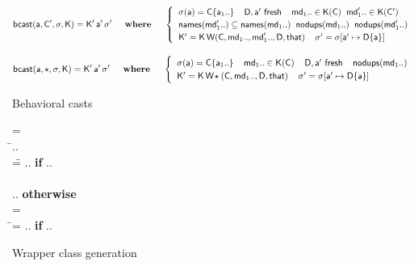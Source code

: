 \documentclass[acmsmall, anonymous, authordraft, review]{acmart} %
\begin{document}
\begin{figure}[!b]
\hrulefill
\small

\vspace{-4mm}

\begin{equation*}
  \behcastE\a\Cp\s\K \Kp\ap\sp \HS\HS\WHERE\HS\HS \begin{cases}
\HS  \App\s\a = \obj\C{\a[1]..} \HS\HS
  \fresh{\D,\ap} \HS\HS
  \md[1].. \In \App\K\C \HS \mdp[1].. \In \App\K\Cp \\\HS
  \names{\mdp[1]..} \subseteq \names{\md[1]..} \HS \cload{\md[1]..} \HS \cload{\mdp[1]..} \\\HS
  \Kp = \K\,\wrap\C{\md[1]..}{\mdp[1]..}\D\that \HS\HS
  \sp = \Map \s{\Bind\ap{\obj\D{\a}}} 
  \end{cases}
\end{equation*}

\begin{equation*}
  \behcastE\a\any\s\K \Kp\ap\sp  \HS\HS\WHERE\HS\HS\begin{cases}\HS
  \App\s\a = \obj\C{\a[1]..} \HS\HS \md[1].. \In \App\K\C \HS\HS
  \fresh{\D,\ap} \HS\HS \cload{\md[1]..} \\\HS
  \Kp = \K\,\wrapAny\C{\md[1]..}\D\that \HS\HS
  \sp = \Map \s{\Bind\ap{\obj\D{\a}}} 
\end{cases}\end{equation*}


\hrulefill
\vspace{-2mm}\caption{Behavioral casts}\label{behavetext}

\hrulefill
\small

\begin{tabbing}\small
  \wrap{}\D\that = \\
  \HS\HS\WHERE\HS\= \Mdef\m\x{\t[1]}{\t[2]}\e\In\md[1].. \\
                 \> \mdpp[1] =\= \src{\Mdef\m\x{\tp[1]}{\tp[2]}{~\BehCast{\tp[2]}{\KCall{\FRead\that}\m{\bscast{\tp[1]}\x}{\t[1]}{\t[2]}}}} ..
    \HS \= \textbf{if} \HS \Mdef\m\x{\tp[1]}{\tp[2]}\ep\In\mdp[1].. \\
\\[-3mm]
\> \>  \src{\Mdef\m\x{\t[1]}{\t[2]}{~\KCall{\FRead\that}\m{\x}{\t[1]}{\t[2]}}} ..  \>\textbf{otherwise}
\\[3mm]
   = \\
\HS\HS\WHERE\HS\=\mdp[1] = \src{ \Mdef\m\x{\any}{\any}{~\BehCast\any{ \KCall{\FRead\that} \m {\bscast{\t}\x}{\t}{\tp}} } }   ..
    \HS\HS\HS\HS \= \textbf{if} \HS \Mdef\m\x{\t}{\tp}\e\In\md[1].. \\
\end{tabbing}

\vspace{-5mm}

\hrulefill
\vspace{-2mm}
\caption{Wrapper class generation}\label{w}\end{figure}
\end{document}
